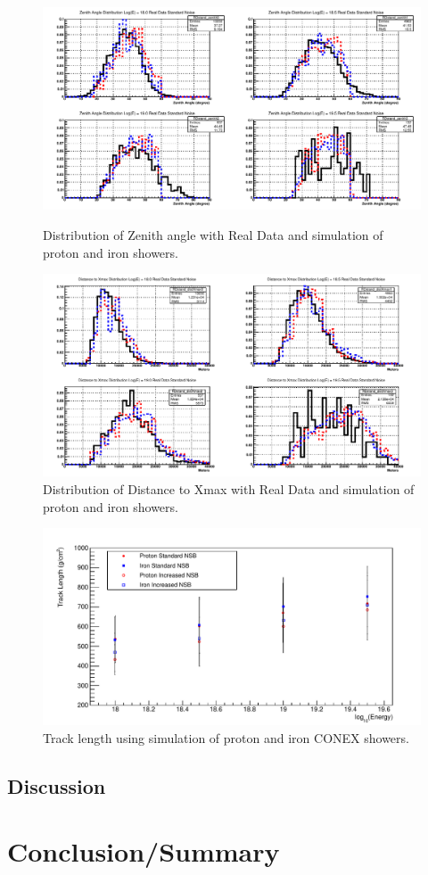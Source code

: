 \begin{figure}
\centering
\includegraphics[width=\textwidth]{chapters/graphs/SelectionEff/RealDataAndSim_ZenithDistComp.pdf}
\caption{Distribution of Zenith angle with Real Data and simulation of proton and iron showers.}
\vspace{3mm}
\includegraphics[width=\textwidth]{chapters/graphs/SelectionEff/RealDataAndSim_DistToXmaxDistComp.pdf}
\caption{Distribution of Distance to Xmax with Real Data and simulation of proton and iron showers.}
\end{figure}


\begin{figure}
\centering
\includegraphics[width=\textwidth]{chapters/graphs/SelectionEff/Simulation_TrackLength_Comb_StandANdIncreasedNSB.pdf}
\caption{Track length using simulation of proton and iron CONEX showers.} \label{fig:TrackLength_Sim}
\end{figure}
\subsection{Discussion}

\section{Conclusion/Summary}
